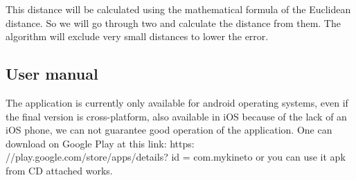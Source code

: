 This distance will be calculated using the mathematical formula of the Euclidean distance.
So we will go through two and calculate the distance from them. The algorithm will exclude very small distances to lower the error.


\subsection{User manual}



The application is currently only available for
android operating systems, even if the final version is
cross-platform, also available in iOS because of
the lack of an iOS phone, we can not guarantee
good operation of the application. One can download on Google Play
at this link: https: //play.google.com/store/apps/details? id = com.mykineto
or you can use it apk from CD attached works.

